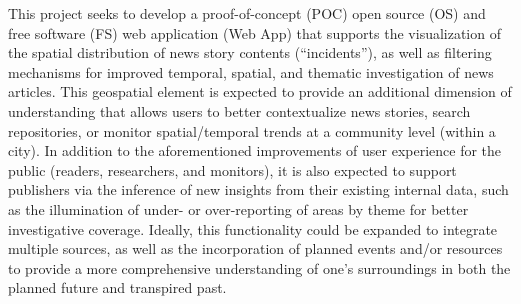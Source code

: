 This project seeks to develop a proof-of-concept (POC) open source (OS) and free software (FS) web application (Web App) that supports the visualization of the spatial distribution of news story contents (“incidents”), as well as filtering mechanisms for improved temporal, spatial, and thematic investigation of news articles. This geospatial element is expected to provide an additional dimension of understanding that allows users to better contextualize news stories, search repositories, or monitor spatial/temporal trends at a community level (within a city). In addition to the aforementioned improvements of user experience for the public (readers, researchers, and monitors), it is also expected to support publishers via the inference of new insights from their existing internal data, such as the illumination of under- or over-reporting of areas by theme for better investigative coverage. Ideally, this functionality could be expanded to integrate multiple sources, as well as the incorporation of planned events and/or resources to provide a more comprehensive understanding of one's surroundings in both the planned future and transpired past.\\

